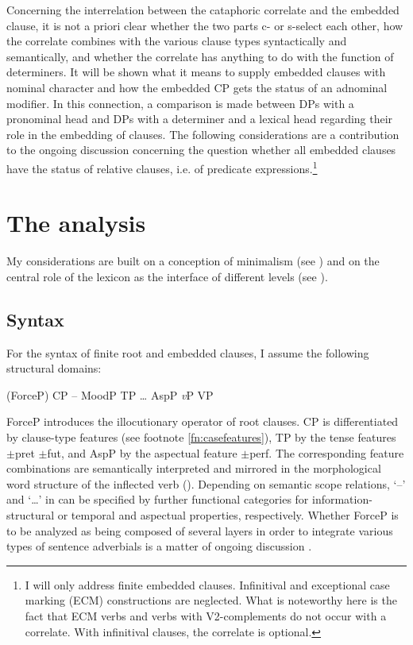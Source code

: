\documentclass[output=paper]{langscibook}
\begin{document}
Concerning the interrelation between the cataphoric correlate and the embedded clause, it is not a priori clear whether the two parts c- or s-select each other, how the correlate combines with the various clause types syntactically and semantically, and whether the correlate has anything to do with the function of determiners. It will be shown what it means to supply embedded clauses with nominal character and how the embedded CP gets the status of an adnominal modifier. In this connection, a comparison is made between DPs with a pronominal head and DPs with a determiner and a lexical head regarding their role in the embedding of clauses. The following considerations are a contribution to the ongoing discussion concerning the question whether all embedded clauses have the status of relative clauses, i.e. of predicate expressions.\footnote{I will only address finite embedded clauses. Infinitival and exceptional case marking (ECM) constructions are neglected. What is noteworthy here is the fact that ECM verbs and verbs with V2-complements do not occur with a correlate. With infinitival clauses, the correlate is optional.}


\section{The analysis}\label{s:2}

My considerations are built on a conception of minimalism (see \citealt{Chomsky1995,Chomsky2001}) and on the central role of the lexicon as the interface of different levels (see \citealt{Zimmermann1987,JackendoffAudrintoappear}).


\subsection{Syntax}\label{s:2.1}
For the syntax of finite root and embedded clauses, I assume the following structural domains:

\ea\label{ex:zimmermann:6} (ForceP) CP -- MoodP TP {\dots} AspP \textit{v}P VP \z

\noindent ForceP introduces the illocutionary operator of root clauses. CP is differentiated by clause-type features (see footnote \ref{fn:casefeatures}), TP by the tense features $\pm$pret $\pm$fut, and AspP by the aspectual feature $\pm$perf. The corresponding feature combinations are semantically interpreted and mirrored in the morphological word structure of the inflected verb (\citealt{Zimmermann1990,Zimmermann2013,Pitsch2014a,Pitsch2014b}). Depending on semantic scope relations, `--' and `{\dots}' in  can be specified by further functional categories for information-structural or temporal and aspectual properties, respectively. Whether ForceP is to be analyzed as being composed of several layers in order to integrate various types of sentence adverbials is a matter of ongoing discussion \citep[see, a.o.,][]{Krifka2021}.
\end{document}
